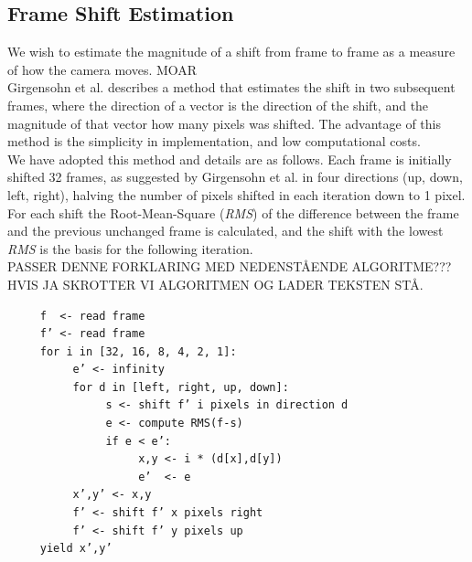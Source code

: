 \subsection{Frame Shift Estimation}
%
We wish to estimate the magnitude of a shift from frame to frame as a measure of how the camera moves. MOAR\\
Girgensohn et al.\cite{Girgensohn:2000:SAH:354401.354415} describes a method that estimates the shift in two subsequent frames, where the direction of a vector is the direction of the shift, and the magnitude of that vector how many pixels was shifted. The advantage of this method is the simplicity in implementation, and low computational costs.\\
We have adopted this method and details are as follows. Each frame is initially shifted 32 frames, as suggested by Girgensohn et al. in four directions (up, down, left, right), halving the number of pixels shifted in each iteration down to 1 pixel.
For each shift the Root-Mean-Square (\textit{RMS}) of the difference between the frame and the previous unchanged frame is calculated, and the shift with the lowest \textit{RMS} is the basis for the following iteration. %
\\PASSER DENNE FORKLARING MED NEDENSTÅENDE ALGORITME??? HVIS JA SKROTTER VI ALGORITMEN OG LADER TEKSTEN STÅ.
%
\begin{verbatim}
     f  <- read frame
     f’ <- read frame
     for i in [32, 16, 8, 4, 2, 1]:
          e’ <- infinity
          for d in [left, right, up, down]:
               s <- shift f’ i pixels in direction d
               e <- compute RMS(f-s)
               if e < e’:
                    x,y <- i * (d[x],d[y])
                    e’  <- e
          x’,y’ <- x,y
          f’ <- shift f’ x pixels right
          f’ <- shift f’ y pixels up
     yield x’,y’
\end{verbatim}
